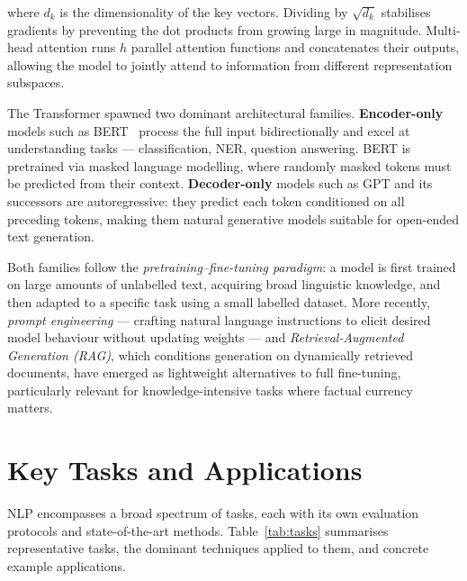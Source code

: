 \documentclass[12pt, a4paper]{article}
\begin{document}
\noindent where $d_k$ is the dimensionality of the key vectors. Dividing by
$\sqrt{d_k}$ stabilises gradients by preventing the dot products from growing
large in magnitude. Multi-head attention runs $h$ parallel attention functions
and concatenates their outputs, allowing the model to jointly attend to
information from different representation subspaces.

The Transformer spawned two dominant architectural families.
\textbf{Encoder-only} models such as BERT~\cite{devlin2018bert} process the
full input bidirectionally and excel at understanding tasks --- classification,
NER, question answering. BERT is pretrained via masked language modelling, where
randomly masked tokens must be predicted from their context. \textbf{Decoder-only}
models such as GPT and its successors are autoregressive: they predict each
token conditioned on all preceding tokens, making them natural generative models
suitable for open-ended text generation.

Both families follow the \textit{pretraining--fine-tuning paradigm}: a model
is first trained on large amounts of unlabelled text, acquiring broad
linguistic knowledge, and then adapted to a specific task using a small labelled
dataset. More recently, \textit{prompt engineering} --- crafting natural language
instructions to elicit desired model behaviour without updating weights ---
and \textit{Retrieval-Augmented Generation (RAG)}, which conditions generation
on dynamically retrieved documents, have emerged as lightweight alternatives to
full fine-tuning, particularly relevant for knowledge-intensive tasks where
factual currency matters.


\section{Key Tasks and Applications}

NLP encompasses a broad spectrum of tasks, each with its own evaluation
protocols and state-of-the-art methods. Table~\ref{tab:tasks} summarises
representative tasks, the dominant techniques applied to them, and concrete
example applications.
\end{document}

